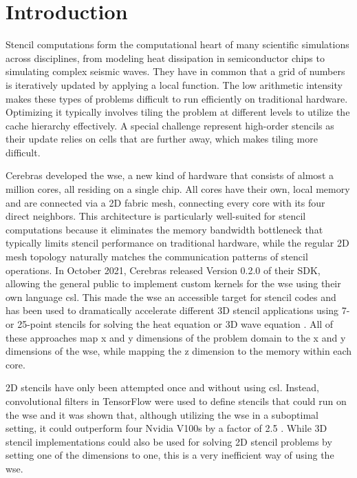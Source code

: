 \chapter{Introduction}
Stencil computations form the computational heart of many scientific simulations across disciplines, from modeling heat dissipation in semiconductor chips to simulating complex seismic waves.
They have in common that a grid of numbers is iteratively updated by applying a local function.
The low arithmetic intensity makes these types of problems difficult to run efficiently on traditional hardware.
Optimizing it typically involves tiling the problem at different levels to utilize the cache hierarchy effectively.
A special challenge represent high-order stencils as their update relies on cells that are further away, which makes tiling more difficult.

Cerebras developed the \acs{wse}, a new kind of hardware that consists of almost a million cores, all residing on a single chip.
All cores have their own, local memory and are connected via a 2D fabric mesh, connecting every core with its four direct neighbors.
This architecture is particularly well-suited for stencil computations because it eliminates the memory bandwidth bottleneck that typically limits stencil performance on traditional hardware, while the regular 2D mesh topology naturally matches the communication patterns of stencil operations.
In October 2021, Cerebras released Version 0.2.0 of their SDK, allowing the general public to implement custom kernels for the \ac{wse} using their own language \ac{csl}. 
This made the \ac{wse} an accessible target for stencil codes and has been used to dramatically accelerate different 3D stencil applications using 7- or 25-point stencils for solving the heat equation or 3D wave equation \cite{jacquelin2022scalable,rocki2020fast,woo2022disruptive,sai2024matrix}.
All of these approaches map x and y dimensions of the problem domain to the x and y dimensions of the \ac{wse}, while mapping the z dimension to the memory within each core.

2D stencils have only been attempted once and without using \ac{csl}. Instead, convolutional filters in TensorFlow were used to define stencils that could run on the \ac{wse} and it was shown that, although utilizing the \ac{wse} in a suboptimal setting, it could outperform four Nvidia V100s by a factor of 2.5 \cite{brown2022tensorflow}. While 3D stencil implementations could also be used for solving 2D stencil problems by setting one of the dimensions to one, this is a very inefficient way of using the \ac{wse}.

